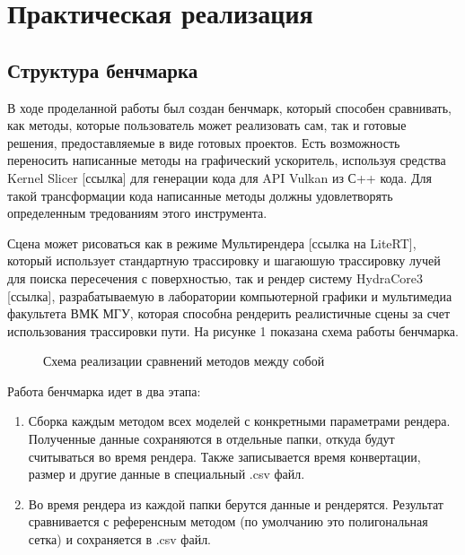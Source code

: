 \documentclass[a4paper,hidelinks,12pt]{article}
\begin{document}
\newpage

\section{Практическая реализация}

\subsection{Структура бенчмарка}

В ходе проделанной работы был создан бенчмарк, который способен сравнивать, как методы, которые пользователь может реализовать сам, так и готовые решения, 
предоставляемые в виде готовых проектов. Есть возможность переносить написанные методы на графический ускоритель, используя средства Kernel Slicer [ссылка] для генерации кода для 
API Vulkan из С++ кода. Для такой трансформации кода написанные методы должны удовлетворять определенным тредованиям этого инструмента. 

Сцена может рисоваться 
как в режиме Мультирендера [ссылка на LiteRT], который использует стандартную трассировку и шагаюшую трассировку лучей для поиска пересечения с поверхностью, так и рендер систему 
HydraCore3 [ссылка], разрабатываемую в лаборатории компьютерной графики и мультимедиа факультета ВМК МГУ, которая способна рендерить реалистичные сцены
за счет использования трассировки пути. На рисунке 1 показана схема работы бенчмарка.

\begin{figure}[h]
  \centering
  \caption{Схема реализации сравнений методов между собой}
  \label{fig:my_label}
\end{figure}

\newpage

Работа бенчмарка идет в два этапа:
\begin{enumerate}
	\item Сборка каждым методом всех моделей с конкретными параметрами рендера. Полученные данные сохраняются в отдельные папки, откуда будут считываться во время рендера. Также записывается 
	время конвертации, размер и другие данные в специальный .csv файл.
	\item Во время рендера из каждой папки берутся данные и рендерятся. Результат сравнивается с референсным методом (по умолчанию это полигональная сетка) и сохраняется в .csv файл.
\end{enumerate}
\end{document}
